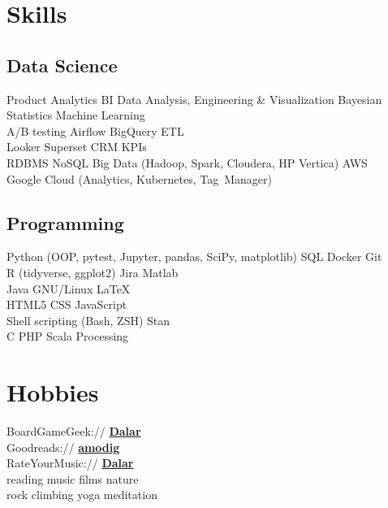 \documentclass[]{deedy-resume-openfont}
\begin{document}
\begin{minipage}[t]{0.33\textwidth}

\section{Skills}
\subsection{Data Science}
Product Analytics \textbullet{} BI \textbullet{} Data Analysis, Engineering \& Visualization \textbullet{} Bayesian Statistics \textbullet{} Machine Learning \\
A/B testing \textbullet{} Airflow \textbullet{} BigQuery \textbullet{} ETL \\
Looker \textbullet{} Superset \textbullet{} CRM \textbullet{} KPIs \\
RDBMS \textbullet{} NoSQL \textbullet{}
Big Data (Hadoop, Spark, Cloudera, HP Vertica) \textbullet{} AWS \\
Google Cloud (Analytics, Kubernetes, Tag~Manager)
\sectionsep
\subsection{Programming}
Python (OOP, pytest, Jupyter, pandas, SciPy, matplotlib) \textbullet{} SQL \textbullet{} Docker \textbullet{} Git\\
 R (tidyverse, ggplot2) \textbullet{} Jira \textbullet{} Matlab \\ Java \textbullet{} GNU/Linux \textbullet{}\LaTeX \\ 
HTML5 \textbullet{} CSS \textbullet{} JavaScript \\
Shell scripting (Bash, ZSH) \textbullet{} Stan \\
C \textbullet{} PHP \textbullet{} Scala \textbullet{} Processing
\sectionsep


\section{Hobbies}
BoardGameGeek:// \href{https://boardgamegeek.com/user/dalar}{\bf Dalar} \\
Goodreads:// \href{https://goodreads.com/amodig}{\bf amodig} \\
RateYourMusic:// \href{https://rateyourmusic.com/~Dalar}{\bf Dalar} \\
reading \textbullet{} music \textbullet{} films \textbullet{} nature \\
rock climbing \textbullet{} yoga \textbullet{} meditation

%
%

\end{minipage} 
\end{document}
